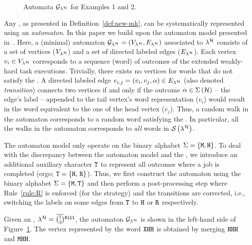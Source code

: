 \begin{figure}[t]
    \caption{Automata $\mathcal{G}_{\lambda^{\mathcal{H}}}$ for Examples 1 and 2.}
    \label{fig:min-graph}
\end{figure}
%
Any \ewhc{}, as presented in Definition~\ref{def:new-mk}, can be systematically represented using an \emph{automaton}.
In this paper we build upon the \tool{} automaton model presented in~{\cite{Vreman:2022}}.
Here, a (minimal) automaton $\mathcal{G}_{\lambda^{\mathcal{H}}} = \left(V_{\lambda^{\mathcal{H}}}, E_{\lambda^{\mathcal{H}}}\right)$ associated to $\lambda^{\mathcal{H}}$ consists of a set of vertices ($V_{\lambda^{\mathcal{H}}}$) and a set of directed labeled edges ($E_{\lambda^{\mathcal{H}}}$). 
Each vertex $v_i \in V_{\lambda^{\mathcal{H}}}$ corresponds to a sequence (word) of outcomes of the extended weakly-hard task executions. 
Trivially, there exists no vertices for words that do not satisfy the \ewhc{}.
A directed labeled edge $e_{i, j} = \left(v_i, v_j, \alpha \right) \in E_{\lambda^{\mathcal{H}}}$ (also denoted \emph{transition}) connects two vertices if and only if the outcome $\alpha \in \Sigma\left(\mathcal{H}\right)$ -- the edge's label -- appended to the tail vertex's word representation ($v_i$) would result in the word equivalent to the one of the head vertex ($v_j$).
Thus, a random walk in the automaton corresponds to a random word satisfying the \ewhc{}.
In particular, all the walks in the automaton corresponds to \emph{all} words in $\mathcal{S}_{}\left( \lambda^{\mathcal{H}} \right)$.

The \tool{} automaton model only operate on the binary alphabet $\Sigma = \left\{\texttt{M}, \texttt{H}\right\}$. 
To deal with the discrepancy between the \tool{} automaton model and the \ewhc{}, we introduce an additional auxiliary character $\texttt{T}$ to represent all outcomes where a job is completed (ergo; $\texttt{T} = \left\{ \texttt{H},\, \texttt{R} \right\}$).
Thus, we first construct the automaton using the binary alphabet $\Sigma = \{\texttt{M}, \texttt{T}\}$ and then perform a post-processing step where Rule~\ref{rule:R} is enforced (for the \tS{} strategy) and the transitions are corrected, i.e., switching the labels on some edges from $\texttt{T}$ to $\texttt{H}$ or $\texttt{R}$ respectively. 

\begin{example}%
    \label{ex:auto-kill}%
    Given an \ewhc{}, $\lambda^{\strat} = \overbar{\binom{1}{3}}^{\tK{}}$, the automaton $\mathcal{G}_{\lambda^{\mathcal{H}}}$ is shown in the left-hand side of Figure~\ref{fig:min-graph}.
    The vertex represented by the word $\texttt{X}\texttt{H}\texttt{H}$ is obtained by merging $\texttt{H}\texttt{H}\texttt{H}$ and $\texttt{M}\texttt{H}\texttt{H}$.
\end{example}

